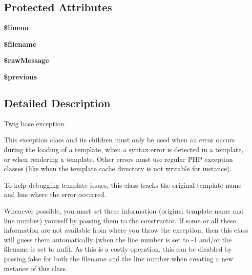 \subsection*{Protected Attributes}
\begin{DoxyCompactItemize}
\item 
\hypertarget{class_twig___error_a865384ce49abf1c78f8aea48c7b5aa48}{}{\bfseries \$lineno}\label{class_twig___error_a865384ce49abf1c78f8aea48c7b5aa48}

\item 
\hypertarget{class_twig___error_a0722441477f957078ee2437054556cbc}{}{\bfseries \$filename}\label{class_twig___error_a0722441477f957078ee2437054556cbc}

\item 
\hypertarget{class_twig___error_a51b60eefca71be4dca4091bc91c65cd4}{}{\bfseries \$raw\+Message}\label{class_twig___error_a51b60eefca71be4dca4091bc91c65cd4}

\item 
\hypertarget{class_twig___error_a4774a105bfb14b9d24aa2357408f32f8}{}{\bfseries \$previous}\label{class_twig___error_a4774a105bfb14b9d24aa2357408f32f8}

\end{DoxyCompactItemize}


\subsection{Detailed Description}
Twig base exception.

This exception class and its children must only be used when an error occurs during the loading of a template, when a syntax error is detected in a template, or when rendering a template. Other errors must use regular P\+H\+P exception classes (like when the template cache directory is not writable for instance).

To help debugging template issues, this class tracks the original template name and line where the error occurred.

Whenever possible, you must set these information (original template name and line number) yourself by passing them to the constructor. If some or all these information are not available from where you throw the exception, then this class will guess them automatically (when the line number is set to -\/1 and/or the filename is set to null). As this is a costly operation, this can be disabled by passing false for both the filename and the line number when creating a new instance of this class.

